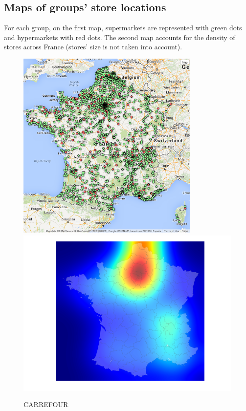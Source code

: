\documentclass[11pt]{article}
\begin{document}
\subsection{Maps of groups' store locations}

For each group, on the first map, supermarkets are represented with green dots and hypermarkets with red dots. The second map accounts for the density of stores across France (stores' size is not taken into account).

\begin{figure}[H]
    \caption{CARREFOUR}
	\centering
		\includegraphics[width=9cm]{images/maps_group_dots/CARREFOUR.png}
        \includegraphics[width=12.8cm]{images/maps_group_heatmaps/CARREFOUR.png}
\end{figure}
\end{document}
